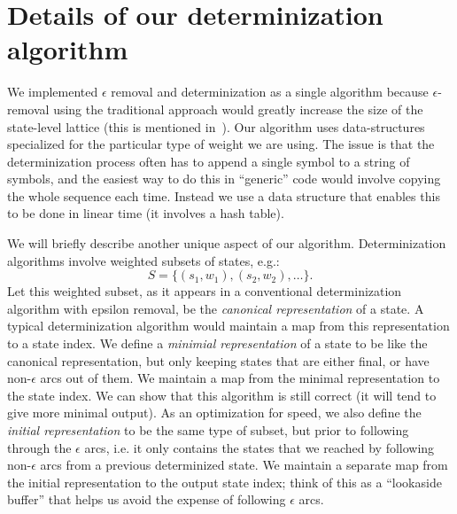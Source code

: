 \documentclass{article}
\begin{document}
\section{Details of our determinization algorithm}
\label{sec:details}

We implemented $\epsilon$ removal and determinization as a single algorithm 
because $\epsilon$-removal using the traditional approach would greatly
increase the size of the state-level lattice (this is mentioned 
in~\cite{efficient_general}).  Our algorithm uses data-structures
specialized for the particular type of weight we are using.  The issue
is that the determinization process often has to append a single symbol to
a string of symbols, and the easiest way to
do this in ``generic'' code would involve copying the whole sequence each time.
Instead we use a data structure that enables this to be done in linear
time (it involves a hash table).  

We will briefly describe another unique aspect of our
algorithm.  Determinization algorithms involve weighted subsets of states, e.g.:
\begin{equation}
   S = \{ (s_1, w_1), (s_2, w_2), \ldots \} .
\end{equation}
Let this weighted subset, as it appears in a conventional determinization
algorithm with epsilon removal, be the {\em canonical representation} of a state.
A typical determinization algorithm would maintain a map from this representation
to a state index.  We define a {\em minimial representation} of a state
to be like the canonical representation, but only keeping states that
are either final, or have non-$\epsilon$ arcs out of them.  We maintain
a map from the minimal representation to the state index.  We can
show that this algorithm is still correct (it will tend to give more
minimal output).   As an optimization for speed, we also define
the {\em initial representation} to be the same type of subset, but prior
to following through the $\epsilon$ arcs, i.e. it only contains the states
that we reached by following non-$\epsilon$ arcs from a previous determinized
state.  We maintain a separate map from the initial representation to
the output state index; think of this as a ``lookaside buffer'' that helps us
avoid the expense of following $\epsilon$ arcs. 
\end{document}
